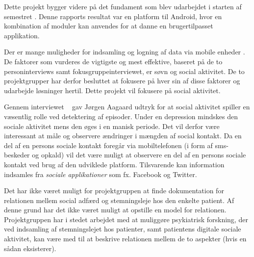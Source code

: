 Dette projekt bygger videre på det fundament som blev udarbejdet i starten af semestret \citefaelles{}.
Denne rapports resultat var en platform til Android, hvor en kombination af moduler kan anvendes for at danne en brugertilpasset applikation.

Der er mange muligheder  for indsamling og logning af data via mobile enheder .
De faktorer som vurderes de vigtigste og mest effektive, baseret på de to personinterviews samt fokusgruppeinterviewet, er søvn og social aktivitet.
De to projektgrupper har derfor besluttet at fokusere på hver sin af disse faktorer og udarbejde løsninger hertil.
Dette projekt vil fokusere på social aktivitet.

Gennem interviewet ~ gav Jørgen Aagaard udtryk for at social aktivitet spiller en væsentlig rolle ved detektering af episoder.
Under en depression mindskes den sociale aktivitet mens den øges i en manisk periode.
Det vil derfor være interessant at måle og observere ændringer i mængden af social kontakt.
Da en del af en persons sociale kontakt foregår via mobiltelefonen (i form af sms-beskeder og opkald) vil det være muligt at observere en del af en persons sociale kontakt ved brug af den udviklede platform.
Tilsvarende kan information indsamles fra \textit{sociale applikationer} som fx. Facebook og Twitter.

Det har ikke været muligt for projektgruppen at finde dokumentation for relationen mellem social adfærd og stemningsleje hos den enkelte patient.
Af denne grund har det ikke været muligt at opstille en model for relationen.
Projektgruppen har i stedet arbejdet med at muliggøre psykiatrisk forskning, der ved indsamling af stemningslejet hos patienter, samt patientens digitale sociale aktivitet, kan være med til at beskrive relationen mellem de to aspekter (hvis en sådan eksisterer).
